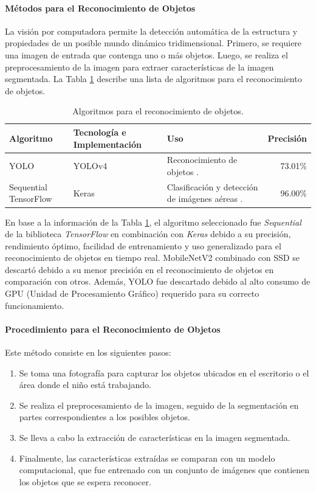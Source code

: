 \paragraph{\textbf{Métodos para el Reconocimiento de Objetos}}			
La visión por computadora permite la detección automática de la estructura y propiedades de un posible mundo dinámico tridimensional. Primero, se requiere una imagen de entrada que contenga uno o más objetos. Luego, se realiza el preprocesamiento de la imagen para extraer características de la imagen segmentada. La Tabla \ref{tab:object-recognition} describe una lista de algoritmos para el reconocimiento de objetos.

\begin{table}[ht!]
\caption{Algoritmos para el reconocimiento de objetos.}
\label{tab:object-recognition}
\centering
\begin{tabular}{p{}p{}p{}p{}}
	\hline
	\multicolumn{1}{l}{\textbf{Algoritmo}} & \multicolumn{1}{l}{\textbf{Tecnología e Implementación}} & \multicolumn{1}{l}{\textbf{Uso}} & \multicolumn{1}{l}{\textbf{Precisión}} \\ \hline
	YOLO & YOLOv4 & Reconocimiento de objetos \citep{Liu2021Objetcs}. & \multicolumn{1}{r}{73.01\%} \\
	Sequential TensorFlow & Keras & Clasificación y detección de imágenes aéreas \citep{Sudharshan2018Object}. & \multicolumn{1}{r}{96.00\%} \\ \hline
\end{tabular}
\end{table}
En base a la información de la Tabla \ref{tab:object-recognition}, el algoritmo seleccionado fue \textit{Sequential} de la biblioteca \textit{TensorFlow} en combinación con \textit{Keras} debido a su precisión, rendimiento óptimo, facilidad de entrenamiento y uso generalizado para el reconocimiento de objetos en tiempo real. MobileNetV2 combinado con SSD se descartó debido a su menor precisión en el reconocimiento de objetos en comparación con otros. Además, YOLO fue descartado debido al alto consumo de GPU (Unidad de Procesamiento Gráfico) requerido para su correcto funcionamiento.

\paragraph{\textbf{Procedimiento para el Reconocimiento de Objetos}}
Este método consiste en los siguientes pasos:
\begin{enumerate}
\item Se toma una fotografía para capturar los objetos ubicados en el escritorio o el área donde el niño está trabajando.
\item Se realiza el preprocesamiento de la imagen, seguido de la segmentación en partes correspondientes a los posibles objetos.
\item Se lleva a cabo la extracción de características en la imagen segmentada.
\item Finalmente, las características extraídas se comparan con un modelo computacional, que fue entrenado con un conjunto de imágenes que contienen los objetos que se espera reconocer.
\end{enumerate}

